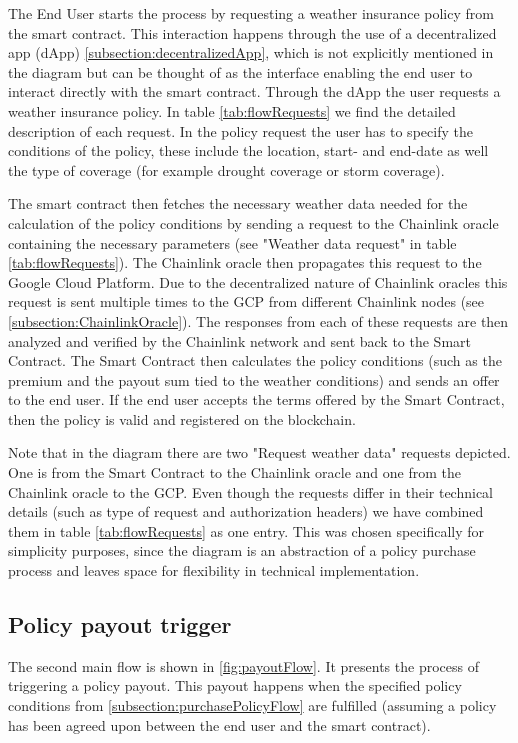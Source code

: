 The End User starts the process by requesting a weather insurance policy from the smart contract. This interaction happens through the use of a decentralized app (dApp) \cref{subsection:decentralizedApp}, which is not explicitly mentioned in the diagram but can be thought of as the interface enabling the end user to interact directly with the smart contract. Through the dApp the user requests a weather insurance policy. In table \cref{tab:flowRequests} we find the detailed description of each request. In the policy request the user has to specify the conditions of the policy, these include the location, start- and end-date as well the type of coverage (for example drought coverage or storm coverage).

The smart contract then fetches the necessary weather data needed for the calculation of the policy conditions by sending a request to the Chainlink oracle containing the necessary parameters (see "Weather data request" in table \cref{tab:flowRequests}). The Chainlink oracle then propagates this request to the Google Cloud Platform. Due to the decentralized nature of Chainlink oracles this request is sent multiple times to the GCP from different Chainlink nodes (see \cref{subsection:ChainlinkOracle}). The responses from each of these requests are then analyzed and verified by the Chainlink network and sent back to the Smart Contract. The Smart Contract then calculates the policy conditions (such as the premium and the payout sum tied to the weather conditions) and sends an offer to the end user. If the end user accepts the terms offered by the Smart Contract, then the policy is valid and registered on the blockchain.

Note that in the diagram there are two "Request weather data" requests depicted. One is from the Smart Contract to the Chainlink oracle and one from the Chainlink oracle to the GCP. Even though the requests differ in their technical details (such as type of request and authorization headers) we have combined them in table \cref{tab:flowRequests} as one entry. This was chosen specifically for simplicity purposes, since the diagram is an abstraction of a policy purchase process and leaves space for flexibility in technical implementation.

\subsection{Policy payout trigger}\label{subsection:policyPayoutTrigger}

The second main flow is shown in \cref{fig:payoutFlow}. It presents the process of triggering a policy payout. This payout happens when the specified policy conditions from \cref{subsection:purchasePolicyFlow} are fulfilled (assuming a policy has been agreed upon between the end user and the smart contract). 

